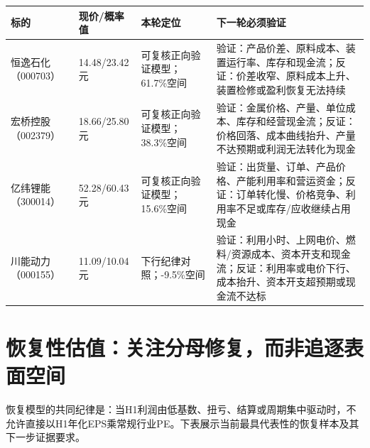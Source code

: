 \noindent
\begin{exhibitbox}
\small
\begin{tabularx}{\textwidth}{L{2.1cm}L{2.4cm}X L{4.0cm}}
\toprule
\textbf{标的} & \textbf{现价/概率值} & \textbf{本轮定位} & \textbf{下一轮必须验证} \\
\midrule
恒逸石化（000703） & 14.48/23.42元 & 可复核正向验证模型；61.7\%空间 & 验证：产品价差、原料成本、装置运行率、库存和现金流；反证：价差收窄、原料成本上升、装置检修或盈利恢复无法持续 \\
宏桥控股（002379） & 18.66/25.80元 & 可复核正向验证模型；38.3\%空间 & 验证：金属价格、产量、单位成本、库存和经营现金流；反证：价格回落、成本曲线抬升、产量不达预期或利润无法转化为现金 \\
亿纬锂能（300014） & 52.28/60.43元 & 可复核正向验证模型；15.6\%空间 & 验证：出货量、订单、产品价格、产能利用率和营运资金；反证：订单转化慢、价格竞争、利用率不足或库存/应收继续占用现金 \\
川能动力（000155） & 11.09/10.04元 & 下行纪律对照；-9.5\%空间 & 验证：利用小时、上网电价、燃料/资源成本、资本开支和现金流；反证：利用率或电价下行、成本抬升、资本开支超预期或现金流不达标 \\
\bottomrule
\end{tabularx}
\normalsize
{}
\end{exhibitbox}

\section{恢复性估值：关注分母修复，而非追逐表面空间}

恢复模型的共同纪律是：当H1利润由低基数、扭亏、结算或周期集中驱动时，不允许直接以H1年化EPS乘常规行业PE。下表展示当前最具代表性的恢复样本及其下一步证据要求。

